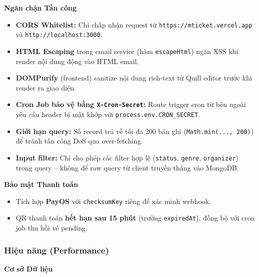 \textbf{Ngăn chặn Tấn công}

\begin{itemize}[leftmargin=*, label={--}]
    \item \textbf{CORS Whitelist:} Chỉ chấp nhận request từ
    \texttt{https://mticket.vercel.app} và \texttt{http://localhost:3000}.

    \item \textbf{HTML Escaping} trong email service (hàm \texttt{escapeHtml})
    ngăn XSS khi render nội dung động vào HTML email.

    \item \textbf{DOMPurify} (frontend) sanitize nội dung rich-text từ Quill
    editor trước khi render ra giao diện.

    \item \textbf{Cron Job bảo vệ bằng \texttt{X-Cron-Secret}:} Route trigger
    cron từ bên ngoài yêu cầu header bí mật khớp với
    \texttt{process.env.CRON\_SECRET}.

    \item \textbf{Giới hạn query:} Số record trả về tối đa 200 bản ghi
    (\texttt{Math.min(..., 200)}) để tránh tấn công DoS qua over-fetching.

    \item \textbf{Input filter:} Chỉ cho phép các filter hợp lệ
    (\texttt{status}, \texttt{genre}, \texttt{organizer}) trong query --
    không để raw query từ client truyền thẳng vào MongoDB.
\end{itemize}

\textbf{Bảo mật Thanh toán}

\begin{itemize}[leftmargin=*, label={--}]
    \item Tích hợp \textbf{PayOS} với \texttt{checksumKey} riêng để xác minh
    webhook.

    \item QR thanh toán \textbf{hết hạn sau 15 phút} (trường \texttt{expiredAt}),
    đồng bộ với cron job thu hồi vé pending.
\end{itemize}

\subsubsection{Hiệu năng (Performance)}

\textbf{Cơ sở Dữ liệu}

